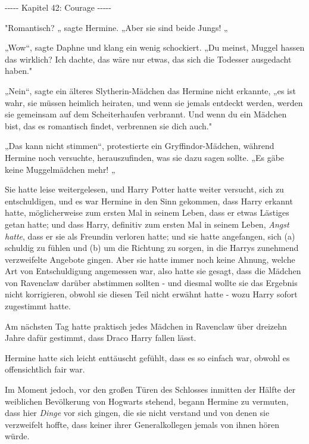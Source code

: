 

\hypertarget{courage}{%

-\/-\/-\/-\/- Kapitel 42: Courage -\/-\/-\/-\/-

"Romantisch? „ sagte Hermine. „Aber sie sind beide Jungs! „

„Wow“, sagte Daphne und klang ein wenig schockiert. „Du meinst, Muggel hassen das wirklich? Ich dachte, das wäre nur etwas, das sich die Todesser ausgedacht haben."

„Nein“, sagte ein älteres Slytherin-Mädchen das Hermine nicht erkannte, „es ist wahr, sie müssen heimlich heiraten, und wenn sie jemals entdeckt werden, werden sie gemeinsam auf dem Scheiterhaufen verbrannt. Und wenn du ein Mädchen bist, das es romantisch findet, verbrennen sie dich auch."

„Das kann nicht stimmen“, protestierte ein Gryffindor-Mädchen, während Hermine noch versuchte, herauszufinden, was sie dazu sagen sollte. „Es gäbe keine Muggelmädchen mehr! „

Sie hatte leise weitergelesen, und Harry Potter hatte weiter versucht, sich zu entschuldigen, und es war Hermine in den Sinn gekommen, dass Harry erkannt hatte, möglicherweise zum ersten Mal in seinem Leben, dass er etwas Lästiges getan hatte; und dass Harry, definitiv zum ersten Mal in seinem Leben, \emph{Angst hatte}, dass er sie als Freundin verloren hatte; und sie hatte angefangen, sich (a) schuldig zu fühlen und (b) um die Richtung zu sorgen, in die Harrys zunehmend verzweifelte Angebote gingen. Aber sie hatte immer noch keine Ahnung, welche Art von Entschuldigung angemessen war, also hatte sie gesagt, dass die Mädchen von Ravenclaw darüber abstimmen sollten - und diesmal wollte sie das Ergebnis nicht korrigieren, obwohl sie diesen Teil nicht erwähnt hatte - wozu Harry sofort zugestimmt hatte.

Am nächsten Tag hatte praktisch jedes Mädchen in Ravenclaw über dreizehn Jahre dafür gestimmt, dass Draco Harry fallen lässt.

Hermine hatte sich leicht enttäuscht gefühlt, dass es so einfach war, obwohl es offensichtlich fair war.

Im Moment jedoch, vor den großen Türen des Schlosses inmitten der Hälfte der weiblichen Bevölkerung von Hogwarts stehend, begann Hermine zu vermuten, dass hier \emph{Dinge} vor sich gingen, die sie nicht verstand und von denen sie verzweifelt hoffte, dass keiner ihrer Generalkollegen jemals von ihnen hören würde.

}
